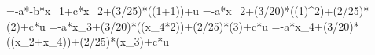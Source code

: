 =-a*-b*x_1+c*x_2+(3/25)*\sin((1+1))+u
=-a*x_2+(3/20)*\sin((1)^2)+(2/25)*\cos(2)+c*u
=-a*x_3+(3/20)*\sin((x_4*2))+(2/25)*\cos(3)+c*u
=-a*x_4+(3/20)*\sin((x_2+x_4))+(2/25)*\cos(x_3)+c*u
